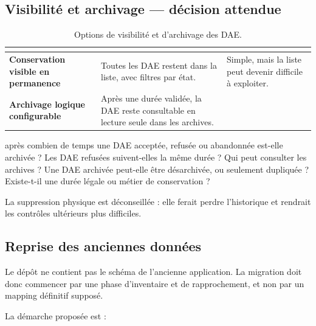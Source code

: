 \subsection{Visibilité et archivage — décision attendue}

\begin{table}[htbp]
\centering
\small
\begin{tabularx}{\textwidth}{>{\bfseries}p{}Yp{0.18\textwidth}}
\toprule
{}
 &  &  \\
\midrule
Conservation visible en permanence & Toutes les DAE restent dans la liste, avec filtres par état. & Simple, mais la liste peut devenir difficile à exploiter. \\
Archivage logique configurable & Après une durée validée, la DAE reste consultable en lecture seule dans les archives. & \recommande{} \\
\bottomrule
\end{tabularx}
\caption{Options de visibilité et d'archivage des DAE.}
\label{tab:options-archivage}
\end{table}

\begin{tcolorbox}[enhanced,colback=orangeClairDAE,colframe=orangeDAE,boxrule=0.6pt,arc=1.5mm]
 après combien de temps une DAE acceptée, refusée ou abandonnée est-elle archivée ? Les DAE refusées suivent-elles la même durée ? Qui peut consulter les archives ? Une DAE archivée peut-elle être désarchivée, ou seulement dupliquée ? Existe-t-il une durée légale ou métier de conservation ?
\end{tcolorbox}

La suppression physique est déconseillée : elle ferait perdre l'historique et rendrait les contrôles ultérieurs plus difficiles.

\subsection{Reprise des anciennes données}

Le dépôt ne contient pas le schéma de l'ancienne application. La migration doit donc commencer par une phase d'inventaire et de rapprochement, et non par un mapping définitif supposé.

La démarche proposée est :

